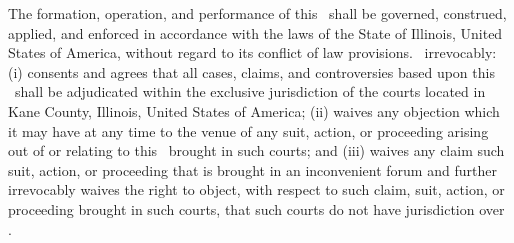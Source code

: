 The formation, operation, and performance of this \amendmentTitle\ shall be governed, construed, applied, and enforced in accordance with the laws of the State of Illinois, United States of America, without regard to its conflict of law provisions. \lessee\ irrevocably: (i) consents and agrees that all cases, claims, and controversies based upon this \amendmentTitle\ shall be adjudicated within the exclusive jurisdiction of the courts located in Kane County, Illinois, United States of America; (ii) waives any objection which it may have at any time to the venue of any suit, action, or proceeding arising out of or relating to this \amendmentTitle\ brought in such courts; and (iii) waives any claim such suit, action, or proceeding that is brought in an inconvenient forum and further irrevocably waives the right to object, with respect to such claim, suit, action, or proceeding brought in such courts, that such courts do not have jurisdiction over \lessor.
